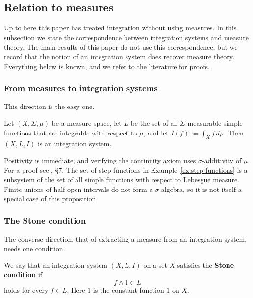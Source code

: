 \subsection{Relation to measures}\label{sec:measure}

Up to here this paper has treated integration without using measures.
In this subsection we state the correspondence between integration systems and
measure theory.
The main results of this paper do not use this correspondence, but we record that
the notion of an integration system does recover measure theory.
Everything below is known, and we refer to the literature for proofs.

\subsubsection{From measures to integration systems}

This direction is the easy one.

\begin{proposition}\label{prop:measure-gives-integral-system}
  Let $(X,\Sigma,\mu)$ be a measure space, let $L$ be the set of all
  $\Sigma$-measurable simple functions that are integrable with respect to
  $\mu$, and let $I(f):=\int_Xf\,d\mu$.
  Then $(X,L,I)$ is an integration system.
\end{proposition}

\noindent
Positivity is immediate, and verifying the continuity axiom uses
$\sigma$-additivity of $\mu$.
For a proof see \cite{BM}, \S7.
The set of step functions in Example~\ref{ex:step-functions} is a subsystem of
the set of all simple functions with respect to Lebesgue measure.
Finite unions of half-open intervals do not form a $\sigma$-algebra, so it is not
itself a special case of this proposition.

\subsubsection{The Stone condition}

The converse direction, that of extracting a measure from an integration system,
needs one condition.

\begin{definition}\label{def:stone-condition}
  We say that an integration system $(X,L,I)$ on a set $X$ satisfies
  the \textbf{Stone condition} if
  \[
    f\wedge1\in L
  \]
  holds for every $f\in L$. Here $1$ is the constant function $1$ on $X$.
\end{definition}

